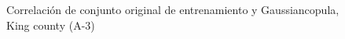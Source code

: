 \begin{figure}[H]
    \centering
    
    \caption{Correlación de conjunto original de entrenamiento y Gaussiancopula, King county (A-3)}
    \label{pairwise-king county-a-3-gaussiancopula}
\end{figure}